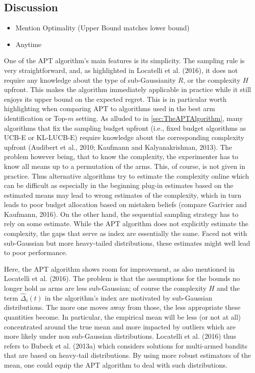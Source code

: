 \documentclass[12pt,]{article}
\providecommand{\tightlist}{%
  \setlength{\itemsep}{0pt}\setlength{\parskip}{0pt}}
\begin{document}
\subsection{\texorpdfstring{Discussion
\label{sec:DiscussionLocatelli}}{Discussion }}\label{discussion}

\begin{itemize}
\tightlist
\item
  Mention Optimality (Upper Bound matches lower bound)
\item
  Anytime
\end{itemize}

One of the APT algorithm's main features is its simplicity. The sampling
rule is very straightforward, and, as highlighted in Locatelli et al.
(2016), it does not require any knowledge about the type of
sub-Gaussianity \(R\), or the complexity \(H\) upfront. This makes the
algorithm immediately applicable in practice while it still enjoys its
upper bound on the expected regret. This is in particular worth
highlighting when comparing APT to algorithms used in the best arm
identification or Top-\(m\) setting. As alluded to in
\autoref{sec:TheAPTAlgorithm}, many algorithms that fix the sampling
budget upfront (i.e., fixed budget algorithms as UCB-E or KL-LUCB-E)
require knowledge about the corresponding complexity upfront (Audibert
et al., 2010; Kaufmann and Kalyanakrishnan, 2013). The problem however
being, that to know the complexity, the experimenter has to know all
means up to a permutation of the arms. This, of course, is not given in
practice. Thus alternative algorithms try to estimate the complexity
online which can be difficult as especially in the beginning plug-in
estimates based on the estimated means may lead to wrong estimates of
the complexity, which in turn leads to poor budget allocation based on
mistaken beliefs (compare Garivier and Kaufmann, 2016). On the other
hand, the sequential sampling strategy has to rely on some estimate.
While the APT algorithm does not explicitly estimate the complexity, the
gaps that serve as index are essentially the same. Faced not with
sub-Gaussian but more heavy-tailed distributions, these estimates might
well lead to poor performance.

Here, the APT algorithm shows room for improvement, as also mentioned in
Locatelli et al. (2016). The problem is that the assumptions for the
bounds no longer hold as arms are less sub-Gaussian; of course the
complexity \(H\) and the term \(\hat{\Delta}_i(t)\) in the algorithm's
index are motivated by sub-Gaussian distributions. The more one moves
away from those, the less appropriate these quantities become. In
particular, the empirical mean will be less (or not at all) concentrated
around the true mean and more impacted by outliers which are more likely
under non sub-Gaussian distributions. Locatelli et al. (2016) thus
refers to Bubeck et al. (2013a) which considers solutions for
multi-armed bandits that are based on heavy-tail distributions. By using
more robust estimators of the mean, one could equip the APT algorithm to
deal with such distributions.
\end{document}
